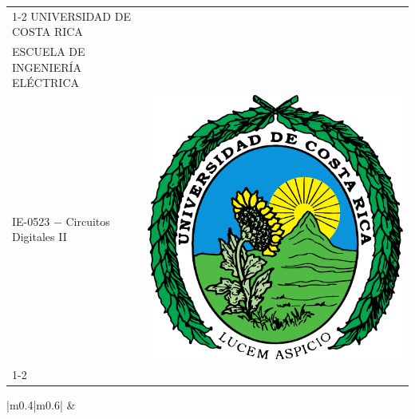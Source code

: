 \documentclass[12pt,a4paper]{article}
\begin{document}
 

\begin{table}[H]
    \centering
    \begin{tabular} {|m{}|m{}|}
      \cline{1-2}
        \centering
        \vspace{0.2cm}
        UNIVERSIDAD DE COSTA RICA \\ \vspace{0.2cm}
         ESCUELA DE INGENIERÍA ELÉCTRICA \\ \vspace{0.2cm}
         IE-0523 $-$ Circuitos Digitales II \vspace{0.2cm}
        &
        \includegraphics[width=\linewidth]{IMG/Imagen1.png}\\
      \cline{1-2}
    \end{tabular}
    
    \begin{tabular} {|m{}|m{}|}
        &
         \\
        

    \end{tabular}
\end{table}







\end{document}
